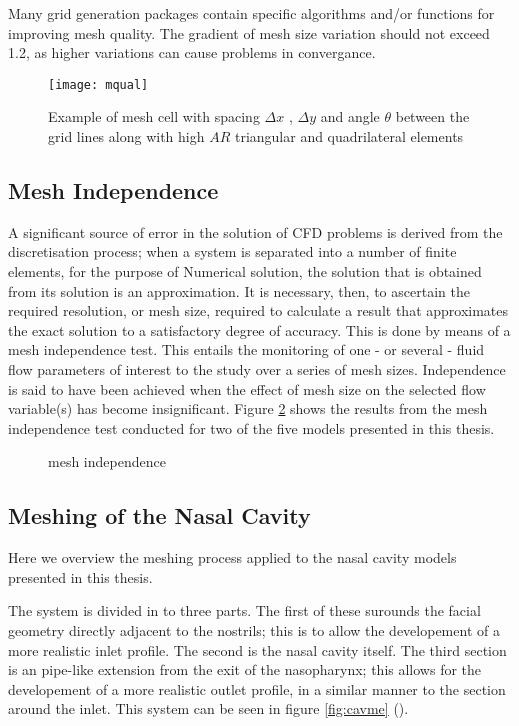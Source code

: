 Many grid generation packages contain specific algorithms and/or functions for improving mesh quality. The gradient of mesh size variation should not exceed 1.2, as higher variations can cause problems in convergance.

\begin{figure}
  \texttt{[image: mqual]}
  \caption{Example of mesh cell with spacing $\Delta x$ , $\Delta y$ and angle $ \theta $ between the grid lines along with high $AR$ triangular and quadrilateral elements } \label{fig:mqual}
\end{figure}

\subsection{Mesh Independence}

A significant source of error in the solution of CFD problems is derived from the discretisation process; when a system is separated into a number of finite elements, for the purpose of Numerical solution, the solution that is obtained from its solution is an approximation. It is necessary, then, to ascertain the required resolution, or mesh size, required to calculate a result that approximates the exact solution to a satisfactory degree of accuracy. This is done by means of a mesh independence test. This entails the monitoring of one - or several - fluid flow parameters of interest to the study over a series of mesh sizes. Independence is said to have been achieved when the effect of mesh size on the selected flow variable(s) has become insignificant. Figure \ref{fig:mind} shows the results from the mesh independence test conducted for two of the five models presented in this thesis.

\begin{figure}

  \caption{mesh independence} \label{fig:mind}

\end{figure}
\subsection{Meshing of the Nasal Cavity}

Here we overview the meshing process applied to the nasal cavity models presented in this thesis.

The system is divided in to three parts. The first of these surounds the facial geometry directly adjacent to the nostrils; this is to allow the developement of a more realistic inlet profile. The second is the nasal cavity itself. The third section is an pipe-like extension from the exit of the nasopharynx; this allows for the developement of a more realistic outlet profile, in a similar manner to the section around the inlet. This system can be seen in figure \ref{fig:cavme} ().

